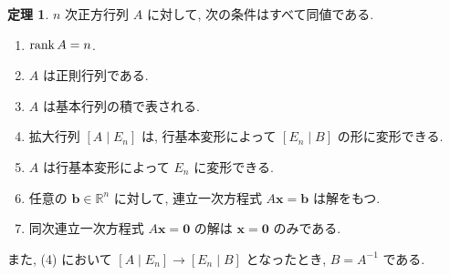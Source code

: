 \documentclass[dvipdfmx,a4paper,11pt]{article} %
\newcommand{\R}{\mathbb{R}}
\newcommand{\En}{E_n}
\newcommand{\bvec}{\boldsymbol{b}}
\newcommand{\xvec}{\boldsymbol{x}}
\theoremstyle{definition}
\newtheorem{thm}{定理}
\begin{document}
\begin{thm}
$n$ 次正方行列 $A$ に対して, 次の条件はすべて同値である.
\begin{enumerate}[label=\textup{(\arabic*)}]
\item $\rank A=n$.
\item $A$ は正則行列である.
\item $A$ は基本行列の積で表される.
\item 拡大行列 $[A\mid \En]$ は, 行基本変形によって $[\En\mid B]$ の形に変形できる.
\item $A$ は行基本変形によって $\En$ に変形できる.
\item 任意の $\bvec\in\R^n$ に対して, 連立一次方程式
\(
A\xvec=\bvec
\)
は解をもつ.
\item 同次連立一次方程式
\(
A\xvec=\boldsymbol{0}
\)
の解は $\xvec=\boldsymbol{0}$ のみである.
\end{enumerate}
また, \textup{(4)} において
\(
[A\mid \En]\longrightarrow [\En\mid B]
\)
となったとき,
\(
B=A^{-1}
\)
である.
\end{thm}
\end{document}
